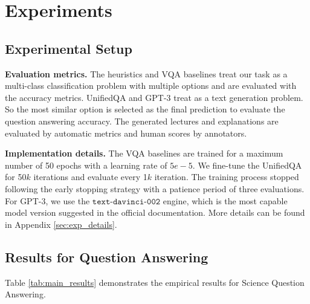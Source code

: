\section{Experiments}
\label{sec:experiment}

\subsection{Experimental Setup}
\label{sec:exp_setup}
\textbf{Evaluation metrics.} The heuristics and VQA baselines treat our \name{} task as a multi-class classification problem with multiple options and are evaluated with the accuracy metrics. UnifiedQA and GPT-3 treat \name{} as a text generation problem. So the most similar option is selected as the final prediction to evaluate the question answering accuracy. The generated lectures and explanations are evaluated by automatic metrics \cite{papineni2002bleu,lin2004rouge,reimers-2019-sentence-bert} and human scores by annotators.

\textbf{Implementation details.} The VQA baselines are trained for a maximum number of 50 epochs with a learning rate of $5e{-}5$. We fine-tune the UnifiedQA for 50$k$ iterations and evaluate every 1$k$ iteration. The training process  stopped following the early stopping strategy with a patience period of three evaluations. For GPT-3, we use the $\texttt{text-davinci-002}$ engine, which is the most capable model version suggested in the official documentation. More details can be found in Appendix \ref{sec:exp_details}.

\subsection{Results for Question Answering}

Table \ref{tab:main_results} demonstrates the empirical results for Science Question Answering. 


